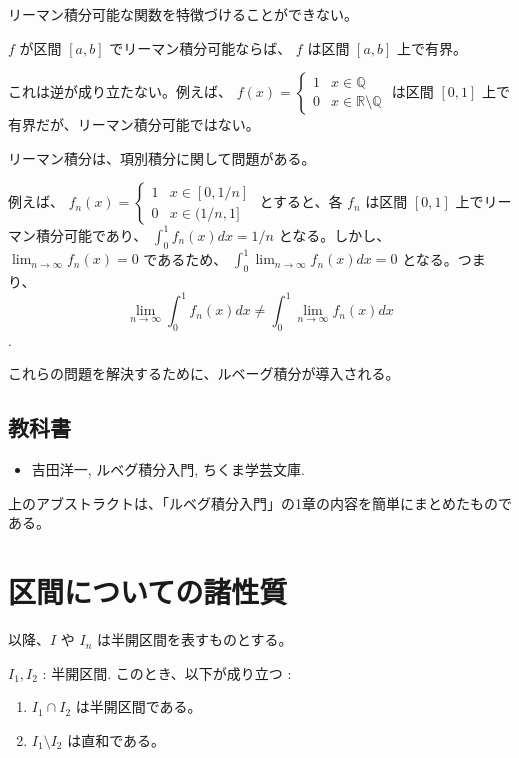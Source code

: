 \documentclass[article,paper=a4paper]{jlreq}
\begin{document}
\begin{tcolorbox}[colback=white,colframe=Turquoise4,,title=リーマン積分の欠点1]
    リーマン積分可能な関数を特徴づけることができない。
    \begin{prop}
        $f$ が区間 $[a,b]$ でリーマン積分可能ならば、 $f$ は区間 $[a,b]$ 上で有界。
    \end{prop}
    これは逆が成り立たない。例えば、 $f(x) = \begin{cases} 1 & x \in \mathbb{Q} \\ 0 & x \in \mathbb{R} \setminus \mathbb{Q} \end{cases}$ は区間 $[0,1]$ 上で有界だが、リーマン積分可能ではない。
\end{tcolorbox}

\begin{tcolorbox}[colback=white,colframe=Turquoise4,,title=リーマン積分の欠点2]
    リーマン積分は、項別積分に関して問題がある。\par
    例えば、 $f_n(x) = \begin{cases} 1 & x \in [0,1/n] \\ 0 & x \in (1/n,1] \end{cases}$ とすると、各 $f_n$ は区間 $[0,1]$ 上でリーマン積分可能であり、 $\int_0^1 f_n(x) dx = 1/n$ となる。しかし、 $\lim_{n \to \infty} f_n(x) = 0$ であるため、 $\int_0^1 \lim_{n \to \infty} f_n(x) dx = 0$ となる。つまり、 
    \[\lim_{n \to \infty} \int_0^1 f_n(x) dx \neq \int_0^1 \lim_{n \to \infty} f_n(x) dx\].
\end{tcolorbox}

これらの問題を解決するために、ルベーグ積分が導入される。

\subsection{教科書}
\begin{itemize}
    \item 吉田洋一, ルベグ積分入門, ちくま学芸文庫.
\end{itemize}
上のアブストラクトは、「ルベグ積分入門」の1章の内容を簡単にまとめたものである。


\section{区間についての諸性質}

以降、$I$ や $I_n$ は半開区間を表すものとする。
\begin{prop}\label{prop:prop-1}
    \quad $I_1, I_2$ : 半開区間.
    このとき、以下が成り立つ :
    \begin{enumerate}[label=(\roman*)\,,ref=(\roman*)]
        \item \label{itm:prop-1-i} $I_1 \cap I_2$ は半開区間である。
        \item \label{itm:prop-1-ii} $I_1 \setminus I_2$ は直和である。
    \end{enumerate}
\end{prop}
\end{document}

